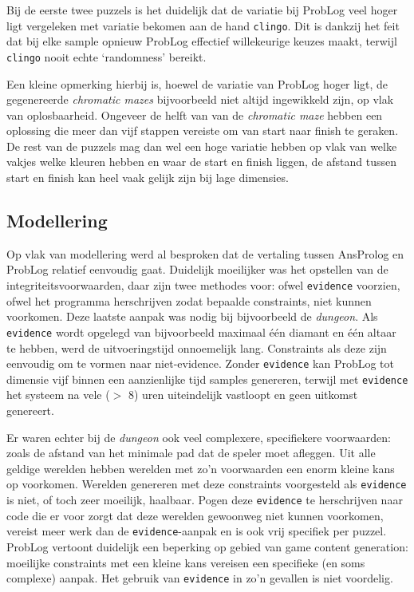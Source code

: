 \documentclass{article}
\begin{document}
	Bij de eerste twee puzzels is het duidelijk dat de variatie bij ProbLog veel hoger ligt vergeleken met variatie bekomen aan de hand \texttt{clingo}. Dit is dankzij het feit dat bij elke sample opnieuw ProbLog effectief willekeurige keuzes maakt, terwijl \texttt{clingo} nooit echte `randomness' bereikt.
	
Een kleine opmerking hierbij is, hoewel de variatie van ProbLog hoger ligt, de gegenereerde \textit{chromatic mazes} bijvoorbeeld niet altijd ingewikkeld zijn, op vlak van oplosbaarheid. Ongeveer de helft van van de \textit{chromatic maze} hebben een oplossing die meer dan vijf stappen vereiste om van start naar finish te geraken. De rest van de puzzels mag dan wel een hoge variatie hebben op vlak van welke vakjes welke kleuren hebben en waar de start en finish liggen, de afstand tussen start en finish kan heel vaak gelijk zijn bij lage dimensies.

	\subsection{Modellering}
	Op vlak van modellering werd al besproken dat de vertaling tussen AnsProlog en ProbLog relatief eenvoudig gaat. Duidelijk moeilijker was het opstellen van de integriteitsvoorwaarden, daar zijn twee methodes voor: ofwel \texttt{evidence} voorzien, ofwel het programma herschrijven zodat bepaalde constraints, niet kunnen voorkomen. Deze laatste aanpak was nodig bij bijvoorbeeld de \textit{dungeon}. Als \texttt{evidence} wordt opgelegd van bijvoorbeeld maximaal \'e\'en diamant en \'e\'en altaar te hebben, werd de uitvoeringstijd onnoemelijk lang. Constraints als deze zijn eenvoudig om te vormen naar niet-evidence. Zonder \texttt{evidence} kan ProbLog tot dimensie vijf binnen een aanzienlijke tijd samples genereren, terwijl met \texttt{evidence} het systeem na vele ($>$ 8) uren uiteindelijk vastloopt en geen uitkomst genereert.
	
Er waren echter bij de \textit{dungeon} ook veel complexere, specifiekere voorwaarden: zoals de afstand van het minimale pad dat de speler moet afleggen. Uit alle geldige werelden hebben werelden met zo'n voorwaarden een enorm kleine kans op voorkomen. Werelden genereren met deze constraints voorgesteld als \texttt{evidence} is niet, of toch zeer moeilijk, haalbaar. Pogen deze \texttt{evidence} te herschrijven naar code die er voor zorgt dat deze werelden gewoonweg niet kunnen voorkomen, vereist meer werk dan de \texttt{evidence}-aanpak en is ook vrij specifiek per puzzel.  ProbLog vertoont duidelijk een beperking op gebied van game content generation: moeilijke constraints met een kleine kans vereisen een specifieke (en soms complexe) aanpak. Het gebruik van \texttt{evidence} in zo'n gevallen is niet voordelig.
	
\end{document}
